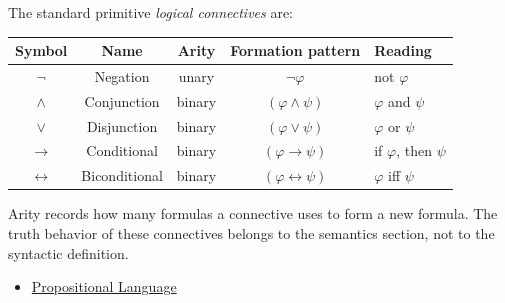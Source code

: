 \begin{tcolorbox}[colback=propbox, colframe=propborder, arc=2pt,
  left=6pt, right=6pt, top=4pt, bottom=4pt,
  title={\small\textbf{Definition (Logical Connective)}},
  fonttitle=\small\bfseries]
\label{def:logical-connective}
The standard primitive \emph{logical connectives} are:
\begin{center}
\renewcommand{\arraystretch}{1.25}
\begin{tabular}{c c c c l}
\toprule
\textbf{Symbol} & \textbf{Name} & \textbf{Arity} & \textbf{Formation pattern} & \textbf{Reading} \\
\midrule
$\neg$ & Negation & unary & $\neg\varphi$ & not $\varphi$ \\
$\land$ & Conjunction & binary & $(\varphi\land\psi)$ & $\varphi$ and $\psi$ \\
$\lor$ & Disjunction & binary & $(\varphi\lor\psi)$ & $\varphi$ or $\psi$ \\
$\to$ & Conditional & binary & $(\varphi\to\psi)$ & if $\varphi$, then $\psi$ \\
$\leftrightarrow$ & Biconditional & binary & $(\varphi\leftrightarrow\psi)$ & $\varphi$ iff $\psi$ \\
\bottomrule
\end{tabular}
\end{center}
\end{tcolorbox}

\begin{remark*}[Interpretation]
Arity records how many formulas a connective uses to form a new formula. The
truth behavior of these connectives belongs to the semantics section, not to
the syntactic definition.
\end{remark*}

\begin{dependencies}
\begin{itemize}
  \item \hyperref[def:propositional-language]{Propositional Language}
\end{itemize}
\end{dependencies}
